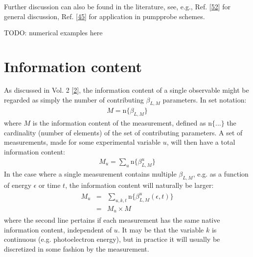 \documentclass[letterpaper,table,10pt,english]{jupyterBook}
\begin{document}
\sphinxAtStartPar
Further discussion can also be found in the literature, see, e.g., Ref. {[}\hyperlink{cite.backmatter/bibliography:id444}{52}{]} for general discussion, Ref. {[}\hyperlink{cite.backmatter/bibliography:id694}{45}{]} for application in pump\sphinxhyphen{}probe schemes.

\sphinxAtStartPar
TODO: numerical examples here

\sphinxstepscope


\section{Information content}
\label{\detokenize{part1/theory_info_content_221122:information-content}}\label{\detokenize{part1/theory_info_content_221122:sec-info-content}}\label{\detokenize{part1/theory_info_content_221122::doc}}
\sphinxAtStartPar
As discussed in  Vol. 2 {[}\hyperlink{cite.backmatter/bibliography:id570}{2}{]}, the information content of a single observable might be regarded as simply the number of contributing \(\beta_{L,M}\) parameters. In set notation:
\begin{equation}\label{equation:part1/theory_info_content_221122:eq:BLM-set}
\begin{split}M=\mathrm{n}\{\beta_{L,M}\}\end{split}
\end{equation}
\sphinxAtStartPar
where \(M\) is the information content of the measurement, defined as
\(\mathrm{n}\{...\}\) the cardinality (number of elements) of the set of
contributing parameters. A set of measurements, made for some
experimental variable \(u\), will then have a total information content:
\begin{equation*}
\begin{split}M_{u}=\sum_{u}\mathrm{n}\{\beta_{L,M}^{u}\}\end{split}
\end{equation*}
\sphinxAtStartPar
In the case where a single measurement contains multiple \(\beta_{L,M}\),
e.g. as a function of energy \(\epsilon\) or time \(t\), the information
content will naturally be larger:
\begin{equation*}
\begin{split}\begin{aligned}
M_{u} & = & \sum_{u,k,t}\mathrm{n}\{\beta_{L,M}^{u}(\epsilon,t)\}\\
 & = & M_{u}\times M\end{aligned}\end{split}
\end{equation*}
\sphinxAtStartPar
where the second line pertains if each measurement has the same native
information content, independent of \(u\). It may be that the variable \(k\)
is continuous (e.g. photoelectron energy), but in practice it will
usually be discretized in some fashion by the measurement.
\end{document}
